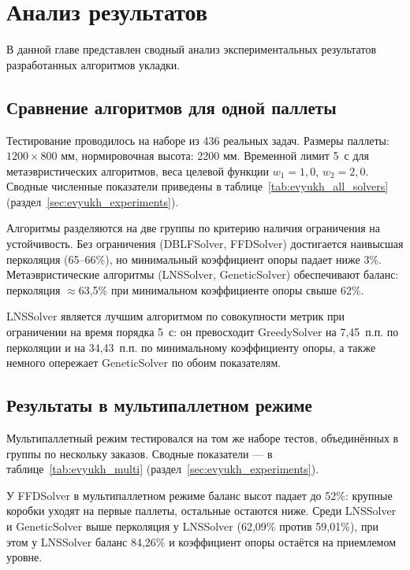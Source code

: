 \chapter{Анализ результатов}
\label{ch:6}

В данной главе представлен сводный анализ экспериментальных результатов разработанных алгоритмов укладки.

\section{Сравнение алгоритмов для одной паллеты}

Тестирование проводилось на наборе из 436 реальных задач. Размеры паллеты: $1200 \times 800$ мм, нормировочная высота: 2200 мм. Временной лимит 5~с для метаэвристических алгоритмов, веса целевой функции $w_1 = 1{,}0$, $w_2 = 2{,}0$. Сводные численные показатели приведены в таблице~\ref{tab:evyukh_all_solvers} (раздел~\ref{sec:evyukh_experiments}).

Алгоритмы разделяются на две группы по критерию наличия ограничения на устойчивость. Без ограничения (DBLFSolver, FFDSolver) достигается наивысшая перколяция (65--66\%), но минимальный коэффициент опоры падает ниже 3\%. Метаэвристические алгоритмы (LNSSolver, GeneticSolver) обеспечивают баланс: перколяция $\approx$63,5\% при минимальном коэффициенте опоры свыше 62\%.

LNSSolver является лучшим алгоритмом по совокупности метрик при ограничении на время порядка 5~с: он превосходит GreedySolver на 7,45~п.п. по перколяции и на 34,43~п.п. по минимальному коэффициенту опоры, а также немного опережает GeneticSolver по обоим показателям.

\section{Результаты в мультипаллетном режиме}

Мультипаллетный режим тестировался на том же наборе тестов, объединённых в группы по нескольку заказов. Сводные показатели --- в таблице~\ref{tab:evyukh_multi} (раздел~\ref{sec:evyukh_experiments}).

У FFDSolver в мультипаллетном режиме баланс высот падает до 52\%: крупные коробки уходят на первые паллеты, остальные остаются ниже. Среди LNSSolver и GeneticSolver выше перколяция у LNSSolver (62,09\% против 59,01\%), при этом у LNSSolver баланс 84,26\% и коэффициент опоры остаётся на приемлемом уровне.